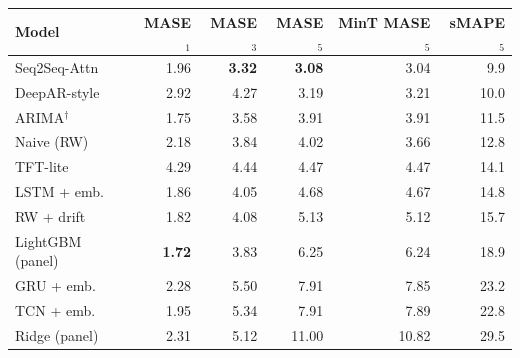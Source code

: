 \begin{tabular}{lrrrrr}
\toprule
Model & MASE$_1$ & MASE$_3$ & MASE$_5$ & MinT MASE$_5$ & sMAPE$_5$ \\
\midrule
Seq2Seq-Attn & 1.96 & \textbf{3.32} & \textbf{3.08} & 3.04 & 9.9 \\
DeepAR-style & 2.92 & 4.27 & 3.19 & 3.21 & 10.0 \\
ARIMA$^\dagger$ & 1.75 & 3.58 & 3.91 & 3.91 & 11.5 \\
Naive (RW) & 2.18 & 3.84 & 4.02 & 3.66 & 12.8 \\
TFT-lite & 4.29 & 4.44 & 4.47 & 4.47 & 14.1 \\
LSTM + emb. & 1.86 & 4.05 & 4.68 & 4.67 & 14.8 \\
RW + drift & 1.82 & 4.08 & 5.13 & 5.12 & 15.7 \\
LightGBM (panel) & \textbf{1.72} & 3.83 & 6.25 & 6.24 & 18.9 \\
GRU + emb. & 2.28 & 5.50 & 7.91 & 7.85 & 23.2 \\
TCN + emb. & 1.95 & 5.34 & 7.91 & 7.89 & 22.8 \\
Ridge (panel) & 2.31 & 5.12 & 11.00 & 10.82 & 29.5 \\
\bottomrule
\end{tabular}
